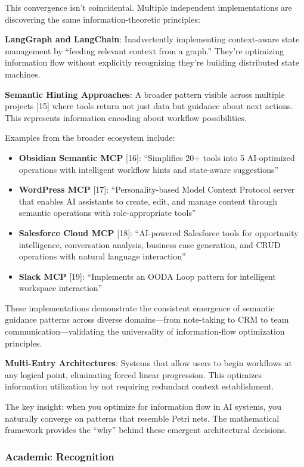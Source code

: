 \documentclass[11pt,a4paper]{article}
\begin{document}
This convergence isn't coincidental. Multiple independent implementations are discovering the same information-theoretic principles:

\textbf{LangGraph and LangChain}: Inadvertently implementing context-aware state management by ``feeding relevant context from a graph.'' They're optimizing information flow without explicitly recognizing they're building distributed state machines.

\textbf{Semantic Hinting Approaches}: A broader pattern visible across multiple projects [15] where tools return not just data but guidance about next actions. This represents information encoding about workflow possibilities.

Examples from the broader ecosystem include:
\begin{itemize}
\item \textbf{Obsidian Semantic MCP} [16]: ``Simplifies 20+ tools into 5 AI-optimized operations with intelligent workflow hints and state-aware suggestions''
\item \textbf{WordPress MCP} [17]: ``Personality-based Model Context Protocol server that enables AI assistants to create, edit, and manage content through semantic operations with role-appropriate tools''
\item \textbf{Salesforce Cloud MCP} [18]: ``AI-powered Salesforce tools for opportunity intelligence, conversation analysis, business case generation, and CRUD operations with natural language interaction''
\item \textbf{Slack MCP} [19]: ``Implements an OODA Loop pattern for intelligent workspace interaction''
\end{itemize}

These implementations demonstrate the consistent emergence of semantic guidance patterns across diverse domains—from note-taking to CRM to team communication—validating the universality of information-flow optimization principles.

\textbf{Multi-Entry Architectures}: Systems that allow users to begin workflows at any logical point, eliminating forced linear progression. This optimizes information utilization by not requiring redundant context establishment.

The key insight: when you optimize for information flow in AI systems, you naturally converge on patterns that resemble Petri nets. The mathematical framework provides the ``why'' behind these emergent architectural decisions.

\subsubsection{Academic Recognition}
\end{document}
